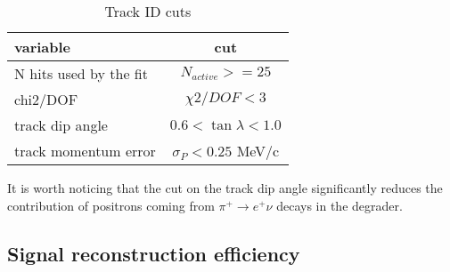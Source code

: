 \begin{table}[H]
  \centering
  \begin{tabularx} {0.5\textwidth}{|X|c|}  %
    \hline
    variable                &   cut                        \\
    \hline                         
    N hits used by the fit  &   $N_{active}>= 25$            \\
    \hline                         
    chi2/DOF                &   $\chi2/DOF < 3$            \\
    \hline                         
    track dip angle         &   $0.6 < \tan \lambda < 1.0$ \\
    \hline                         
    track momentum error    &   $\sigma_P < 0.25$ MeV/c     \\
    \hline
  \end{tabularx}
  \caption{
    \label{table:track_id_cuts}
    Track ID cuts
  }
\end{table}

It is worth noticing that the cut on the track dip angle significantly reduces
the contribution of positrons coming from $\pi^+ \to e^+ \nu$ decays in the degrader.

\subsection{Signal reconstruction efficiency}


